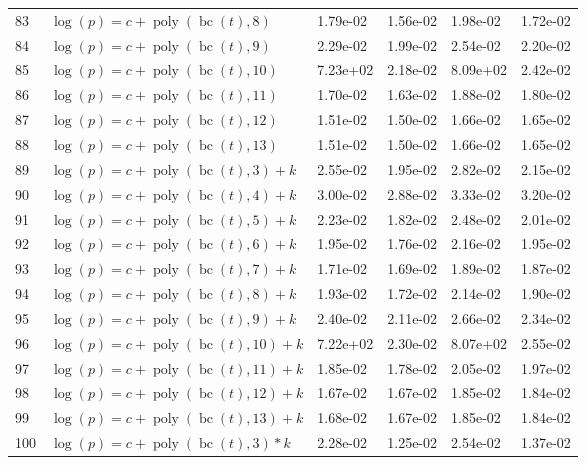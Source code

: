 \documentclass[12pt,a4paper]{article}
\DeclareMathOperator{\bc}{bc}
\DeclareMathOperator{\poly}{poly}
\begin{document}
\begin{longtable}[t]{ll>{\raggedleft\arraybackslash}p{2cm}>{\raggedleft\arraybackslash}p{2cm}>{\raggedleft\arraybackslash}p{2cm}>{\raggedleft\arraybackslash}p{2cm}}
\rowcolor{gray!6}  83 & $\log(p) = c + \poly\left( \bc(t), 8 \right)$ & 1.79e-02 & 1.56e-02 & 1.98e-02 & 1.72e-02\\
84 & $\log(p) = c + \poly\left( \bc(t), 9 \right)$ & 2.29e-02 & 1.99e-02 & 2.54e-02 & 2.20e-02\\
\rowcolor{gray!6}  85 & $\log(p) = c + \poly\left( \bc(t), 10 \right)$ & 7.23e+02 & 2.18e-02 & 8.09e+02 & 2.42e-02\\
86 & $\log(p) = c + \poly\left( \bc(t), 11 \right)$ & 1.70e-02 & 1.63e-02 & 1.88e-02 & 1.80e-02\\
\rowcolor{gray!6}  87 & $\log(p) = c + \poly\left( \bc(t), 12 \right)$ & 1.51e-02 & 1.50e-02 & 1.66e-02 & 1.65e-02\\
88 & $\log(p) = c + \poly\left( \bc(t), 13 \right)$ & 1.51e-02 & 1.50e-02 & 1.66e-02 & 1.65e-02\\
\rowcolor{gray!6}  89 & $\log(p) = c + \poly\left( \bc(t), 3 \right) + k$ & 2.55e-02 & 1.95e-02 & 2.82e-02 & 2.15e-02\\
90 & $\log(p) = c + \poly\left( \bc(t), 4 \right) + k$ & 3.00e-02 & 2.88e-02 & 3.33e-02 & 3.20e-02\\
\rowcolor{gray!6}  91 & $\log(p) = c + \poly\left( \bc(t), 5 \right) + k$ & 2.23e-02 & 1.82e-02 & 2.48e-02 & 2.01e-02\\
92 & $\log(p) = c + \poly\left( \bc(t), 6 \right) + k$ & 1.95e-02 & 1.76e-02 & 2.16e-02 & 1.95e-02\\
\rowcolor{gray!6}  93 & $\log(p) = c + \poly\left( \bc(t), 7 \right) + k$ & 1.71e-02 & 1.69e-02 & 1.89e-02 & 1.87e-02\\
94 & $\log(p) = c + \poly\left( \bc(t), 8 \right) + k$ & 1.93e-02 & 1.72e-02 & 2.14e-02 & 1.90e-02\\
\rowcolor{gray!6}  95 & $\log(p) = c + \poly\left( \bc(t), 9 \right) + k$ & 2.40e-02 & 2.11e-02 & 2.66e-02 & 2.34e-02\\
96 & $\log(p) = c + \poly\left( \bc(t), 10 \right) + k$ & 7.22e+02 & 2.30e-02 & 8.07e+02 & 2.55e-02\\
\rowcolor{gray!6}  97 & $\log(p) = c + \poly\left( \bc(t), 11 \right) + k$ & 1.85e-02 & 1.78e-02 & 2.05e-02 & 1.97e-02\\
98 & $\log(p) = c + \poly\left( \bc(t), 12 \right) + k$ & 1.67e-02 & 1.67e-02 & 1.85e-02 & 1.84e-02\\
\rowcolor{gray!6}  99 & $\log(p) = c + \poly\left( \bc(t), 13 \right) + k$ & 1.68e-02 & 1.67e-02 & 1.85e-02 & 1.84e-02\\
100 & $\log(p) = c + \poly\left( \bc(t), 3 \right) * k$ & 2.28e-02 & 1.25e-02 & 2.54e-02 & 1.37e-02\\

\end{longtable}
\end{document}
